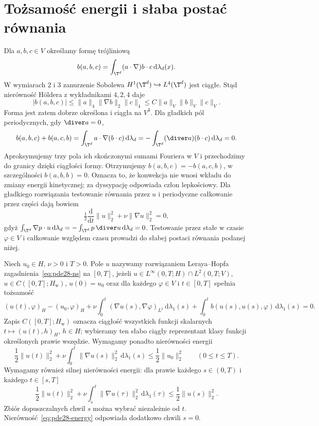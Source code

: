 \section{Tożsamość energii i słaba postać równania}
Dla $a,b,c\in V$ określamy formę trójliniową
\[
 b(a,b,c)=\int_{\T^d}(a\cdot\nabla)b\cdot c\,\mathrm d\lambda_d(x).
\]
W wymiarach $2$ i $3$ zanurzenie Sobolewa
$H^1(\T^d)\hookrightarrow L^4(\T^d)$ jest ciągłe.
Stąd nierówność Höldera z wykładnikami $4,2,4$ daje
\[
 |b(a,b,c)|\le\|a\|_4\|\nabla b\|_2\|c\|_4
 \le C\|a\|_V\|b\|_V\|c\|_V.
\]
Forma jest zatem dobrze określona i ciągła na $V^3$.
Dla gładkich pól periodycznych, gdy $\diver a=0$,
\[
 b(a,b,c)+b(a,c,b)
 =\int_{\T^d}a\cdot\nabla(b\cdot c)\,
 \mathrm d\lambda_d
 =-\int_{\T^d}(\diver a)(b\cdot c)\,\mathrm d\lambda_d=0.
\]
Aproksymujemy trzy pola ich skończonymi sumami Fouriera
w $V$ i przechodzimy do granicy dzięki ciągłości formy.
Otrzymujemy $b(a,b,c)=-b(a,c,b)$, w szczególności
$b(a,b,b)=0$. Oznacza to, że konwekcja nie wnosi
wkładu do zmiany energii kinetycznej; za dyssypację
odpowiada człon lepkościowy.
Dla gładkiego rozwiązania testowanie równania przez $u$
i periodyczne całkowanie przez części dają bowiem
\[
 \tfrac12\frac{\mathrm d}{\mathrm dt}\|u\|_2^2
 +\nu\|\nabla u\|_2^2=0,
\]
gdyż $\int_{\T^d}\nabla p\cdot u\,\mathrm d\lambda_d
=-\int_{\T^d}p\,\diver u\,\mathrm d\lambda_d=0$.
Testowanie przez stałe w czasie $\varphi\in V$
i całkowanie względem czasu prowadzi do słabej
postaci równania podanej niżej.

\begin{definicja}\label{def:pde28-leray}
Niech $u_0\in H$, $\nu>0$ i $T>0$. Pole $u$ nazywamy
rozwiązaniem Leraya--Hopfa zagadnienia~\eqref{eq:pde28-ns} na $[0,T]$,
jeżeli $u\in L^\infty(0,T;H)\cap L^2(0,T;V)$,
$u\in C([0,T];H_{\mathrm w})$, $u(0)=u_0$ oraz dla każdego
$\varphi\in V$ i $t\in[0,T]$ spełnia tożsamość
\begin{equation}\label{eq:pde28-weak}
 (u(t),\varphi)_H-(u_0,\varphi)_H
 +\nu\int_0^t(\nabla u(s),\nabla\varphi)_{L^2}\,\mathrm d\lambda_1(s)
 +\int_0^t b(u(s),u(s),\varphi)\,\mathrm d\lambda_1(s)=0.
\end{equation}
Zapis $C([0,T];H_{\mathrm w})$ oznacza ciągłość wszystkich
funkcji skalarnych $t\mapsto(u(t),h)_H$, $h\in H$;
wybieramy ten słabo ciągły reprezentant klasy
funkcji określonych prawie wszędzie.
Wymagamy ponadto nierówności energii
\begin{equation}\label{eq:pde28-energy}
 \frac12\|u(t)\|_2^2+\nu\int_0^t\|\nabla u(s)\|_2^2\,\mathrm d\lambda_1(s)
 \le\frac12\|u_0\|_2^2\qquad (0\le t\le T).
\end{equation}
Wymagamy również silnej nierówności energii:
dla prawie każdego $s\in(0,T)$ i każdego $t\in[s,T]$
\begin{equation}\label{eq:pde28-energy-shift}
 \frac12\|u(t)\|_2^2+
 \nu\int_s^t\|\nabla u(\tau)\|_2^2\,\mathrm d\lambda_1(\tau)
 \le\frac12\|u(s)\|_2^2.
\end{equation}
Zbiór dopuszczalnych chwil $s$ można wybrać
niezależnie od $t$. Nierówność~\eqref{eq:pde28-energy}
odpowiada dodatkowo chwili $s=0$.
\end{definicja}

